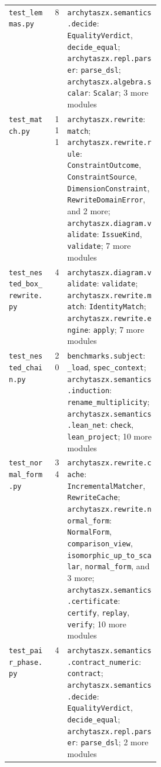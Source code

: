 \begin{xltabular}{\linewidth}{@{}>{\raggedright\arraybackslash}p{0.3\linewidth}r>{\raggedright\arraybackslash}X@{}}
\texttt{test\_\allowbreak{}lemmas.py} & 8 & \texttt{archytaszx.\allowbreak{}semantics.\allowbreak{}decide}: \texttt{EqualityVerdict}, \texttt{decide\_\allowbreak{}equal}; \texttt{archytaszx.\allowbreak{}repl.\allowbreak{}parser}: \texttt{parse\_\allowbreak{}dsl}; \texttt{archytaszx.\allowbreak{}algebra.\allowbreak{}scalar}: \texttt{Scalar}; 3 more modules \\
\texttt{test\_\allowbreak{}match.py} & 111 & \texttt{archytaszx.\allowbreak{}rewrite}: \texttt{match}; \texttt{archytaszx.\allowbreak{}rewrite.\allowbreak{}rule}: \texttt{ConstraintOutcome}, \texttt{ConstraintSource}, \texttt{DimensionConstraint}, \texttt{RewriteDomainError}, and 2 more; \texttt{archytaszx.\allowbreak{}diagram.\allowbreak{}validate}: \texttt{IssueKind}, \texttt{validate}; 7 more modules \\
\texttt{test\_\allowbreak{}nested\_\allowbreak{}box\_\allowbreak{}rewrite.py} & 4 & \texttt{archytaszx.\allowbreak{}diagram.\allowbreak{}validate}: \texttt{validate}; \texttt{archytaszx.\allowbreak{}rewrite.\allowbreak{}match}: \texttt{IdentityMatch}; \texttt{archytaszx.\allowbreak{}rewrite.\allowbreak{}engine}: \texttt{apply}; 7 more modules \\
\texttt{test\_\allowbreak{}nested\_\allowbreak{}chain.py} & 20 & \texttt{benchmarks.\allowbreak{}subject}: \texttt{\_\allowbreak{}load}, \texttt{spec\_\allowbreak{}context}; \texttt{archytaszx.\allowbreak{}semantics.\allowbreak{}induction}: \texttt{rename\_\allowbreak{}multiplicity}; \texttt{archytaszx.\allowbreak{}semantics.\allowbreak{}lean\_\allowbreak{}net}: \texttt{check}, \texttt{lean\_\allowbreak{}project}; 10 more modules \\
\texttt{test\_\allowbreak{}normal\_\allowbreak{}form.py} & 34 & \texttt{archytaszx.\allowbreak{}rewrite.\allowbreak{}cache}: \texttt{IncrementalMatcher}, \texttt{RewriteCache}; \texttt{archytaszx.\allowbreak{}rewrite.\allowbreak{}normal\_\allowbreak{}form}: \texttt{NormalForm}, \texttt{comparison\_\allowbreak{}view}, \texttt{isomorphic\_\allowbreak{}up\_\allowbreak{}to\_\allowbreak{}scalar}, \texttt{normal\_\allowbreak{}form}, and 3 more; \texttt{archytaszx.\allowbreak{}semantics.\allowbreak{}certificate}: \texttt{certify}, \texttt{replay}, \texttt{verify}; 10 more modules \\
\texttt{test\_\allowbreak{}pair\_\allowbreak{}phase.py} & 4 & \texttt{archytaszx.\allowbreak{}semantics.\allowbreak{}contract\_\allowbreak{}numeric}: \texttt{contract}; \texttt{archytaszx.\allowbreak{}semantics.\allowbreak{}decide}: \texttt{EqualityVerdict}, \texttt{decide\_\allowbreak{}equal}; \texttt{archytaszx.\allowbreak{}repl.\allowbreak{}parser}: \texttt{parse\_\allowbreak{}dsl}; 2 more modules \\

\end{xltabular}
